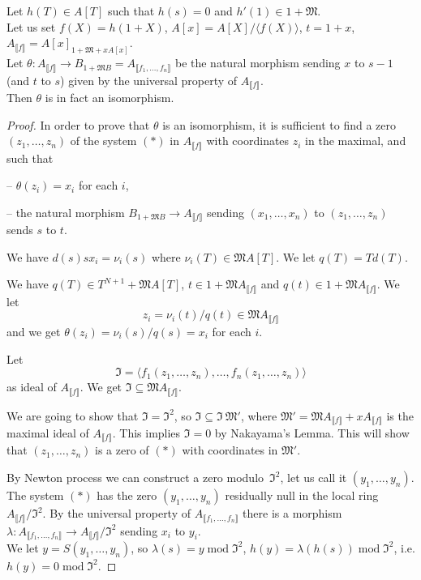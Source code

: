\documentclass[11pt,a4paper,twoside]{article}
\newcommand{\gothic}{\mathfrak}
\newcommand{\fI}{{\gothic I}}
\newcommand{\fM}{{\gothic M}}
\newcommand\gen[1]{{\langle #1 \rangle}}
\newcommand\lrb[1] {\llbracket #1 \rrbracket}
\newcommand\Af {{A_{\lrb f}}}
\newcommand\Afn {A_{\lrb{f_1,\dots,f_n}}}
\newcommand{\mod}{\;\mathrm{mod}\;}
\begin{document}
\begin{lemma} \label{lempropMHL} 
Let $h(T)\in  A[T]$ such that  $h(s)=0$ and $h'(1)\in1+\fM$.\\%
Let us set $f(X)=h(1+X)$, $A[x]=A[X]/\gen{f(X)}$, $t=1+x$, $\Af=A[x]_{1+\fM+ x A[x]}$.\\
Let  $\theta:{\Af}\to B_{1+\fM B}=\Afn$ be the  natural morphism
 sending $x$ to $s-1$ (and $t$ to $s$) given by the universal property of $\Af$.\\
Then  $\theta$ is in fact an isomorphism.
\end{lemma}
%
\begin{proof}
In order to prove that $\theta$ is an isomorphism,
it is sufficient to find a zero $(z_1,\dots,z_n)$ of the system $(*)$ in ${\Af}$
with coordinates $z_i$ in the maximal, and such that

\smallskip \noindent\hspace*{.5cm} --  $\theta(z_i)=x_i$ for each $i$, 

\smallskip \noindent \hspace*{.5cm} --  the natural morphism
$B_{1+\fM B}\to {\Af}$ sending $(x_1,\dots,x_n)$ to $(z_1,\dots,z_n)$ 
sends $s$ to $t$.

\smallskip \noindent We have $d(s)sx_i=\nu_i(s)$ where $\nu_i(T)\in \fM A[T]$.
We let $q(T)=Td(T)$.

\noindent We have $q(T)\in T^{N+1}+\fM A[T]$,  $t\in 1+\fM\Af$ and
$q(t)\in 1+\fM\Af$. We let $$z_i=\nu_i(t)/q(t)\in \fM {\Af}$$ 
and we get $\theta(z_i)=\nu_i(s)/q(s)=x_i$ for each $i$.


\noindent Let 
 $$
 \fI=\gen{f_1(z_1,\dots,z_n),\dots,f_n(z_1,\dots,z_n)}
 $$ 
as ideal of $ {\Af}$. We get $\fI\subseteq \fM \Af$.

\smallskip \noindent 
We are going to show that $\fI=\fI^2$, so $\fI\subseteq \fI\ \fM'$, where $\fM'=\fM\Af+x\Af$ is the maximal ideal of $\Af$. This implies $\fI=0$ by Nakayama's Lemma.
This will show that $(z_1,\dots,z_n)$ is a zero of $(*)$ with coordinates in $\fM'$.

\noindent 
  By Newton process we can construct a  zero modulo~$\fI^2$, 
let us call it $(y_1,\dots,y_n)$.
The system $(*)$ has the zero  $(y_1,\dots,y_n)$ residually null in the local 
ring $\Af/\fI^2$. 
By the universal property of $\Afn$ there is a morphism $\lambda:\Afn\to \Af/\fI^2$ sending $x_i$ to $y_i$.
\\
We let $y=S(y_1,\dots,y_n)$, so $\lambda(s)=y\mod \fI^2$,
$h(y)=\lambda(h(s))\mod \fI^2$, i.e. $h(y)= 0\mod \fI^2.$


\end{proof}
\end{document}
